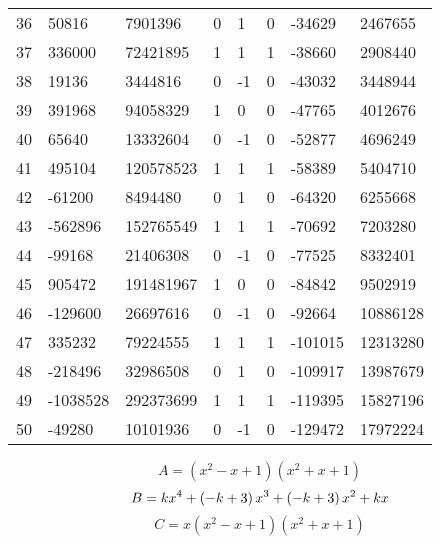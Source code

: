 \documentclass{amsart}
\begin{document}
\begin{longtable}{|l|l|l|lllll|}
36&50816&7901396&0&1&0&-34629&2467655\\
37&336000&72421895&1&1&1&-38660&2908440\\
38&19136&3444816&0&-1&0&-43032&3448944\\
39&391968&94058329&1&0&0&-47765&4012676\\
40&65640&13332604&0&-1&0&-52877&4696249\\
41&495104&120578523&1&1&1&-58389&5404710\\
42&-61200&8494480&0&1&0&-64320&6255668\\
43&-562896&152765549&1&1&1&-70692&7203280\\
44&-99168&21406308&0&-1&0&-77525&8332401\\
45&905472&191481967&1&0&0&-84842&9502919\\
46&-129600&26697616&0&-1&0&-92664&10886128\\
47&335232&79224555&1&1&1&-101015&12313280\\
48&-218496&32986508&0&1&0&-109917&13987679\\
49&-1038528&292373699&1&1&1&-119395&15827196\\
50&-49280&10101936&0&-1&0&-129472&17972224\\
\hline
\end{longtable}
$$A=(x^2
 - x
 + 1)(x^2
 + x
 + 1)$$
$$B=k\*x^4
 + \left(-k
 + 3\right) \*x^3
 + \left(-k
 + 3\right) \*x^2
 + k\*x$$
$$C=x(x^2
 - x
 + 1)(x^2
 + x
 + 1)$$
\end{document}
